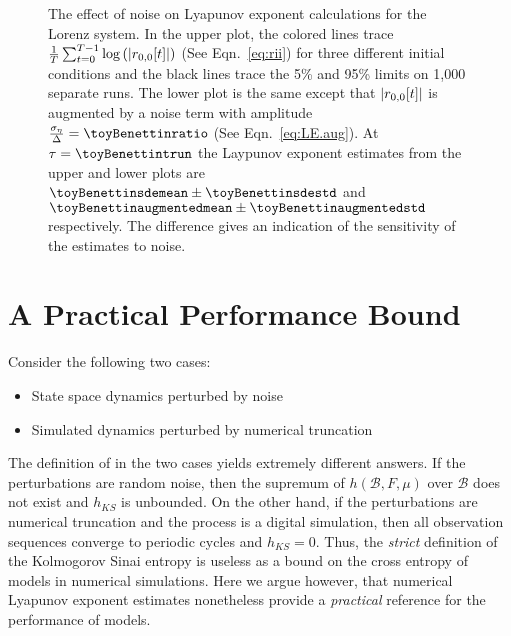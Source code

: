 \begin{figure}[htb]
  \caption[Lyapunov exponent calculation for
  the Lorenz system.]%
  {The effect of noise on Lyapunov exponent calculations for the
    Lorenz system.  In the upper plot, the colored lines trace
    $\frac{1}{T} \sum_{t=0}^{T-1} \log\left( \left| {r_{0,0}}{[t]}
      \right| \right)$ (See Eqn.~\eqref{eq:rii}) for three different
    initial conditions and the black lines trace the 5\% and 95\%
    limits on 1,000 separate runs.  The lower plot is the same except
    that $\left| {r_{0,0}}{[t]} \right|$ is augmented by a noise term
    with amplitude $\frac{\sigma_\eta}{\Delta} = \toyBenettinratio$
    (See Eqn.~\eqref{eq:LE.aug}).  At $\tau=\toyBenettintrun$ the
    Laypunov exponent estimates from the upper and lower plots are
    $\toyBenettinsdemean \pm \toyBenettinsdestd$ and
    $\toyBenettinaugmentedmean \pm \toyBenettinaugmentedstd$
    respectively.  The difference gives an indication of the
    sensitivity of the estimates to noise.}
  \label{fig:benettin}
\end{figure}

\section{A Practical Performance Bound}
\label{sec:PracticalBound}

Consider the following two cases:
\begin{itemize}
\item State space dynamics perturbed by noise
\item Simulated dynamics perturbed by numerical truncation
\end{itemize}
The definition of  in the two cases yields
extremely different answers.  If the perturbations are random noise,
then the supremum of $h(\mathcal{B},F,\mu)$ over $\mathcal{B}$ does
not exist and $h_{KS}$ is unbounded.  On the other hand, if the
perturbations are numerical truncation and the process is a digital
simulation, then all observation sequences converge to periodic cycles
and $h_{KS} = 0$.  Thus, the \emph{strict} definition of the
Kolmogorov Sinai entropy is useless as a bound on the cross entropy of
models in numerical simulations.  Here we argue however, that
numerical Lyapunov exponent estimates nonetheless provide a
\emph{practical} reference for the performance of models.

